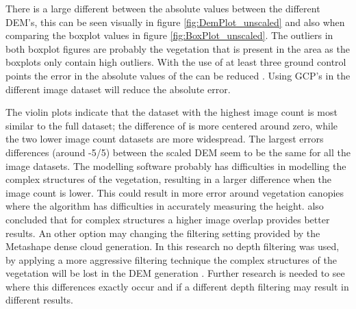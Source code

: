 \documentclass{isprs} %
\begin{document}


There is a large different between the absolute values between the different DEM's, this can be seen visually in figure \ref{fig:DemPlot_unscaled} and also when comparing the boxplot values in figure \ref{fig:BoxPlot_unscaled}.
The outliers in both boxplot figures are probably the vegetation that is present in the area as the boxplots only contain high outliers.
With the use of at least three ground control points the error in the absolute values of the can be reduced \citep{AssessingUAVGCPS, GCPbetterAccuracy, GeoreferencedPointClouds}.
Using GCP's in the different image dataset will reduce the absolute error.

The violin plots indicate that the dataset with the highest image count is most similar to the full dataset; the difference of is more centered around zero, while the two lower image count datasets are more widespread.
The largest errors differences (around -5/5) between the scaled DEM seem to be the same for all the image datasets.
The modelling software probably has difficulties in modelling the complex structures of the vegetation, resulting in a larger difference when the image count is lower.
This could result in more error around vegetation canopies where the algorithm has difficulties in accurately measuring the height. 
\citet{AccessingImageOverlap} also concluded that for complex structures a higher image overlap provides better results.
An other option may changing the filtering setting provided by the Metashape dense cloud generation.
In this research no depth filtering was used, by applying a more aggressive filtering technique the complex structures of the vegetation will be lost in the DEM generation \citep{AgisoftMetashape}.
Further research is needed to see where this differences exactly occur and if a different depth filtering may result in different results.
\end{document}
